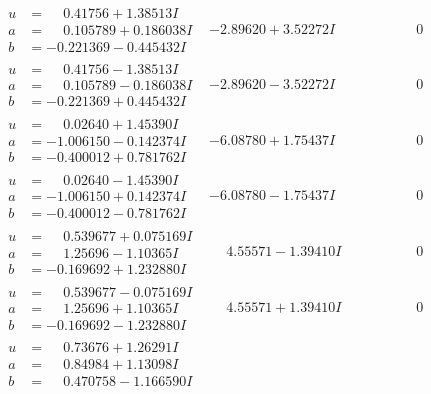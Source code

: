 \documentclass[1p]{elsarticle_modified}
\theoremstyle{definition}
\begin{document}
$$\begin{array}{c|c|c}
\begin{aligned}
u &= \phantom{-}0.41756 + 1.38513 I \\
a &= \phantom{-}0.105789 + 0.186038 I \\
b &= -0.221369 - 0.445432 I\end{aligned}
 & -2.89620 + 3.52272 I & \phantom{-0.000000 } 0 \\ \hline\begin{aligned}
u &= \phantom{-}0.41756 - 1.38513 I \\
a &= \phantom{-}0.105789 - 0.186038 I \\
b &= -0.221369 + 0.445432 I\end{aligned}
 & -2.89620 - 3.52272 I & \phantom{-0.000000 } 0 \\ \hline\begin{aligned}
u &= \phantom{-}0.02640 + 1.45390 I \\
a &= -1.006150 - 0.142374 I \\
b &= -0.400012 + 0.781762 I\end{aligned}
 & -6.08780 + 1.75437 I & \phantom{-0.000000 } 0 \\ \hline\begin{aligned}
u &= \phantom{-}0.02640 - 1.45390 I \\
a &= -1.006150 + 0.142374 I \\
b &= -0.400012 - 0.781762 I\end{aligned}
 & -6.08780 - 1.75437 I & \phantom{-0.000000 } 0 \\ \hline\begin{aligned}
u &= \phantom{-}0.539677 + 0.075169 I \\
a &= \phantom{-}1.25696 - 1.10365 I \\
b &= -0.169692 + 1.232880 I\end{aligned}
 & \phantom{-}4.55571 - 1.39410 I & \phantom{-0.000000 } 0 \\ \hline\begin{aligned}
u &= \phantom{-}0.539677 - 0.075169 I \\
a &= \phantom{-}1.25696 + 1.10365 I \\
b &= -0.169692 - 1.232880 I\end{aligned}
 & \phantom{-}4.55571 + 1.39410 I & \phantom{-0.000000 } 0 \\ \hline\begin{aligned}
u &= \phantom{-}0.73676 + 1.26291 I \\
a &= \phantom{-}0.84984 + 1.13098 I \\
b &= \phantom{-}0.470758 - 1.166590 I\end{aligned}

\end{array}$$
\end{document}
